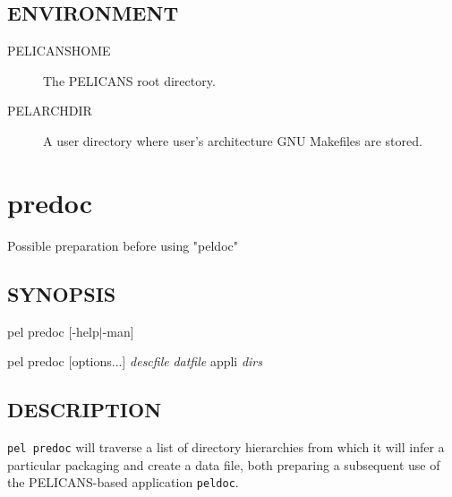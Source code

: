 \documentclass{article}
\begin{document}
\subsection*{ENVIRONMENT\label{arch_ENVIRONMENT}}
\begin{description}

\item[PELICANSHOME] \mbox{}

The PELICANS root directory.


\item[PELARCHDIR] \mbox{}

A user directory where user's architecture GNU Makefiles are stored.

\end{description}
\clearpage
\section{predoc\label{predoc}}


Possible preparation before using "peldoc"

\subsection*{SYNOPSIS\label{predoc_SYNOPSIS}}


pel predoc [-help$|$-man]



pel predoc [options...] \emph{descfile} \emph{datfile} appli \emph{dirs}

\subsection*{DESCRIPTION\label{predoc_DESCRIPTION}}


\texttt{pel predoc} will traverse a list of directory hierarchies
from which it will infer a particular
packaging and create a data file, both
preparing a subsequent use of the PELICANS-based application \texttt{peldoc}.
\end{document}
